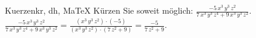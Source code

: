 \begin{MAufgabe}{Kuerzen}{kr, dh, MaTeX}
K\"urzen Sie soweit m\"oglich: $\frac{- 5\, x^3\, y^3\, z^2}{7\, x^3\, y^3\, z^4 + 9\, x^3\, y^3\, z^2}$.\\ 
\ifLsg\MLoesung
\quad $\frac{- 5\, x^3\, y^3\, z^2}{7\, x^3\, y^3\, z^4 + 9\, x^3\, y^3\, z^2}=\frac{(x^3\, y^3\, z^2)\cdot(-5)}{(x^3\, y^3\, z^2)\cdot(7\, z^2 + 9)}=\frac{-5}{7\, z^2 + 9}$.\else\relax\fi
 \end{MAufgabe}